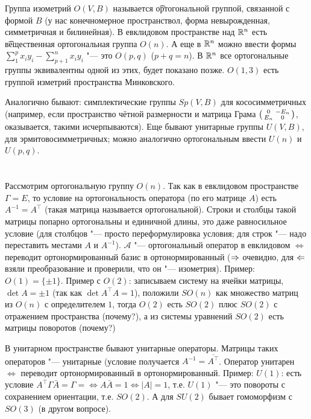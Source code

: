 Группа изометрий $O(V, B)$ называется \t{ортогональной группой, связанной с формой $B$} (у нас конечномерное пространствол, форма невырожденная, симметричная и билинейная).
В евклидовом пространстве над $\mathbb{R}^n$ есть \t{вещественная ортогональная группа} $O(n)$.
А еще в $\mathbb{R}^n$ можно ввести формы $\sum_1^p x_iy_i - \sum_{p+1}^n x_iy_i$ "--- это $O(p, q)$ ($p+q=n$).
В $\mathbb{R}^n$ все ортогональные группы эквивалентны одной из этих, будет показано позже.
$O(1, 3)$ есть группой изметрий пространства Минковского.

Аналогично бывают: симплектические группы $Sp(V, B)$ для кососимметричных (например, если пространство чётной размерности и матрица Грама $\begin{psmallmatrix}0&-E_n\\E_n&0\end{psmallmatrix}$, оказывается, такими исчерпываются).
Еще бывают унитарные группы $U(V, B)$, для эрмитовосимметричных; можно аналогично ортогональным ввести $U(n)$ и $U(p, q)$.

\section{} %
Рассмотрим ортогональную группу $O(n)$.
Так как в евклидовом пространстве $\Gamma=E$, то условие на ортогональность оператора (по его матрице $A$) есть $A^{-1}=A^\top$ (такая матрица называется ортогональной).
Строки и столбцы такой матрицы попарно ортогональны и единичной длины, это даже равносильное условие (для столбцов "--- просто переформулировка условия; для строк "--- надо переставить местами $A$ и $A^{-1}$).
$\mathcal{A}$ "--- ортогональный оператор в евклидовом $\iff$ переводит ортонормированный базис в ортонормированный ($\Rightarrow$ очевидно, для $\Leftarrow$ взяли преобразование и проверили, что он "--- изометрия).
Пример: $O(1)=\{ \pm 1 \}$.
Пример с $O(2)$: записываем систему на ячейки матрицы, $\det A = \pm 1$ (так как $\det A^\top A = 1$), положили $SO(n)$ как множество матриц из $O(n)$ с определителем $1$,
тогда $O(2)$ есть $SO(2)$ плюс $SO(2)$ с отражением пространства (\TODO почему?), а из системы уравнений $SO(2)$ есть матрицы поворотов (\TODO почему?)

В унитарном пространстве бывают унитарные операторы.
Матрицы таких операторов "--- унитарные (условие получается $A^{-1}=\overline{A^\top}$.
Оператор унитарен $\iff$ переводит ортонормированный в ортонормированный.
Пример: $U(1)$: есть условие $A^\top \Gamma \bar A = \Gamma = \iff A \bar A = 1 \iff |A|=1$, т.е. $U(1)$ "--- это повороты с сохранением ориентации, т.е. $SO(2)$.
А для $SU(2)$ бывает гомоморфизм с $SO(3)$ (в другом вопросе).
